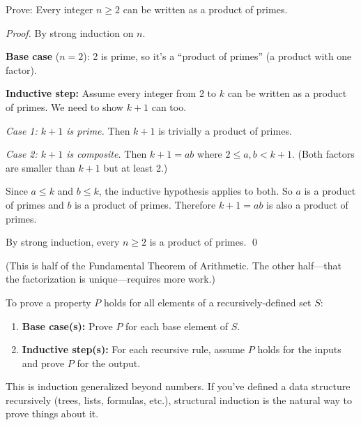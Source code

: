 \begin{example}
Prove: Every integer $n \geq 2$ can be written as a product of primes.

\emph{Proof.} By strong induction on $n$.

\textbf{Base case} ($n = 2$): 2 is prime, so it's a ``product of primes'' (a product with one factor). \checkmark

\textbf{Inductive step:} Assume every integer from 2 to $k$ can be written as a product of primes. We need to show $k + 1$ can too.

\emph{Case 1: $k+1$ is prime.} Then $k+1$ is trivially a product of primes. \checkmark

\emph{Case 2: $k+1$ is composite.} Then $k+1 = ab$ where $2 \leq a, b < k+1$. (Both factors are smaller than $k+1$ but at least 2.)

Since $a \leq k$ and $b \leq k$, the inductive hypothesis applies to both. So $a$ is a product of primes and $b$ is a product of primes. Therefore $k+1 = ab$ is also a product of primes. \checkmark

By strong induction, every $n \geq 2$ is a product of primes. \qed
\end{example}

(This is half of the Fundamental Theorem of Arithmetic. The other half---that the factorization is unique---requires more work.)

\begin{strategy}
To prove a property $P$ holds for all elements of a recursively-defined set $S$:
\begin{enumerate}
  \item \textbf{Base case(s):} Prove $P$ for each base element of $S$.
  \item \textbf{Inductive step(s):} For each recursive rule, assume $P$ holds for the inputs and prove $P$ for the output.
\end{enumerate}

This is induction generalized beyond numbers. If you've defined a data structure recursively (trees, lists, formulas, etc.), structural induction is the natural way to prove things about it.
\end{strategy}

